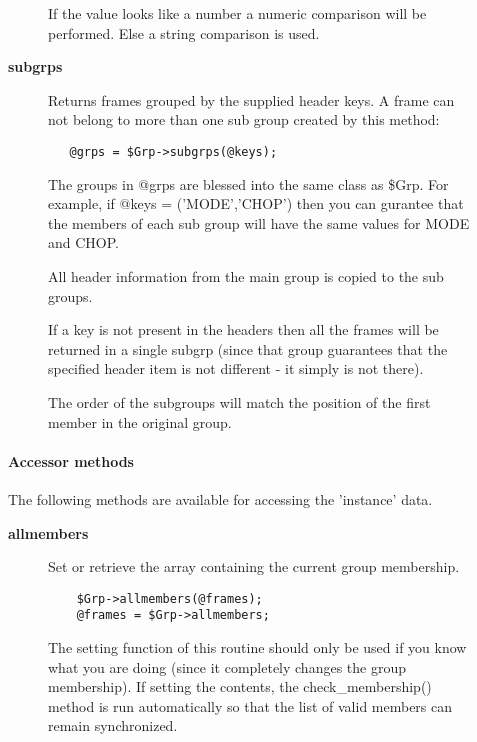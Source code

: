 \begin{description}
\begin{description}
If the value looks like a number a numeric comparison will be performed.
Else a string comparison is used.


\item[{\textbf{subgrps}}] \mbox{}

Returns frames grouped by the supplied header keys.
A frame can not belong to more than one sub group created by this
method:

\begin{verbatim}
   @grps = $Grp->subgrps(@keys);
\end{verbatim}


The groups in @grps are blessed into the same class as \$Grp.
For example, if @keys = ('MODE','CHOP') then you can gurantee
that the members of each sub group will have the same values
for MODE and CHOP.



All header information from the main group is copied to the
sub groups.



If a key is not present in the headers then all the frames
will be returned in a single subgrp (since that group guarantees
that the specified header item is not different - it simply
is not there).



The order of the subgroups will match the position of the first
member in the original group.

\end{description}
\paragraph*{Accessor methods\label{ORAC::Group_Accessor_methods}}


The following methods are available for accessing the 
'instance' data.

\begin{description}

\item[{\textbf{allmembers}}] \mbox{}

Set or retrieve the array containing the current group membership.

\begin{verbatim}
    $Grp->allmembers(@frames);
    @frames = $Grp->allmembers;
\end{verbatim}


The setting function of this routine should only be used
if you know what you are doing (since it completely changes the group
membership). If setting the contents, the check\_membership() method
is run automatically so that the list of valid members can remain
synchronized.




\end{description}
\end{description}
